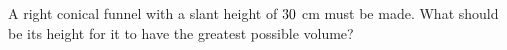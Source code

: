 
%
%
%
%
% 
% 


\question[3] A right conical funnel with a slant height of $30$ cm must be made. What should 
be its height for it to have the greatest possible volume?

\watchout

\ifprintanswers
\fi 

